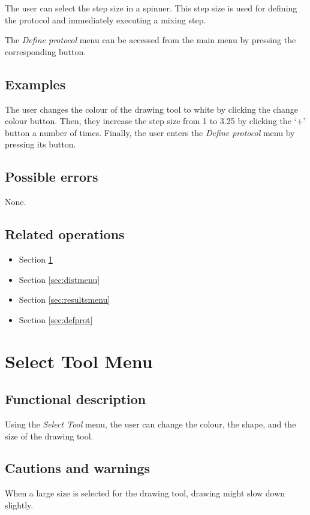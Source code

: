   The user can select the step size in a spinner. This step size is used for defining the protocol and immediately executing a mixing step.
  
  The \emph{Define protocol} menu can be accessed from the main menu by pressing the corresponding button.
  
  \subsection*{Examples}
  The user changes the colour of the drawing tool to white by clicking the change colour button. Then, they increase the step size from 1 to 3.25 by clicking the `+' button a number of times. Finally, the user enters the \emph{Define protocol} menu by pressing its button.

  \subsection*{Possible errors}
  None.

  \subsection*{Related operations}
  \begin{itemize}
    \item Section \ref{sec:selecttoolmenu}
    \item Section \ref{sec:distmenu}
    \item Section \ref{sec:resultsmenu}
    \item Section \ref{sec:defprot}
  \end{itemize}


\section{Select Tool Menu}\label{sec:selecttoolmenu}
  \subsection*{Functional description}
  Using the \emph{Select Tool} menu, the user can change the colour, the shape, and the size of the drawing tool. 

  \subsection*{Cautions and warnings}
  When a large size is selected for the drawing tool, drawing might slow down slightly.


